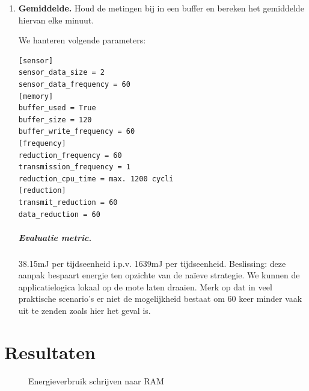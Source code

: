 \documentclass[11pt]{article}
\makeatletter
\def\tikzscale{1}\begin{lrbox}{\measure@tikzpicture}%
\edef\tikzscale{\pgfmathresult}%
\makeatother
\begin{document}
\begin{enumerate}
We hanteren volgende parameters:
\begin{verbatim}
[sensor]
sensor_data_size = 2
sensor_data_frequency = 60
[memory]
buffer_used = True
buffer_size = 120
buffer_write_frequency = 60
[frequency]
reduction_frequency = 60
transmission_frequency = 1
reduction_cpu_time = praktisch 0
[reduction]
transmit_reduction = 60
data_reduction = 1
\end{verbatim}
\subparagraph{Evaluatie metric.} 27.33mJ per tijdseenheid i.p.v. 1639mJ per
tijdseenheid. Beslissing: deze aanpak bespaart energie ten opzichte van de na\"ieve strategie. We kunnen de applicatielogica lokaal op de mote laten draaien.

\item \textbf{Gemiddelde.} Houd de metingen bij in een buffer en bereken
het gemiddelde hiervan elke minuut.

We hanteren volgende parameters:

\begin{verbatim}
[sensor]
sensor_data_size = 2
sensor_data_frequency = 60
[memory]
buffer_used = True
buffer_size = 120
buffer_write_frequency = 60
[frequency]
reduction_frequency = 60
transmission_frequency = 1
reduction_cpu_time = max. 1200 cycli
[reduction]
transmit_reduction = 60
data_reduction = 60
\end{verbatim}

\subparagraph{Evaluatie metric.} 38.15mJ per tijdseenheid i.p.v. 1639mJ per tijdseenheid. Beslissing: deze aanpak bespaart energie ten opzichte van de na\"ieve strategie. We kunnen de applicatielogica lokaal op de mote laten draaien.
Merk op dat in veel praktische scenario's er niet de mogelijkheid bestaat om 60 keer minder vaak uit te zenden zoals hier het geval is.
\end{enumerate}
\section{Resultaten}

\begin{figure}[h]
\centering
\begin{scaletikzpicturetowidth}{\columnwidth}
\end{scaletikzpicturetowidth}
\caption{Energieverbruik schrijven naar RAM}
\label{fig:energieverbruik_ram}
\end{figure}
\end{document}
